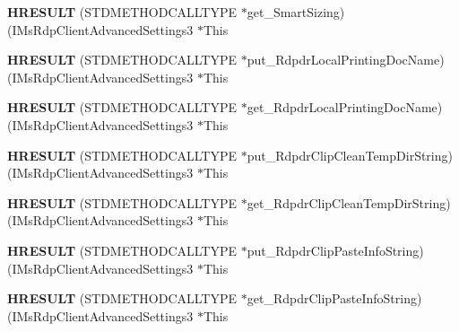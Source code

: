 \begin{DoxyCompactItemize}
{\bfseries H\+R\+E\+S\+U\+LT} (S\+T\+D\+M\+E\+T\+H\+O\+D\+C\+A\+L\+L\+T\+Y\+PE $\ast$get\+\_\+\+Smart\+Sizing)(I\+Ms\+Rdp\+Client\+Advanced\+Settings3 $\ast$This
\item 
\mbox{\label{struct_i_ms_rdp_client_advanced_settings3_vtbl_adcd0b79fb1172077b8ad6058b22fc055}} 
{\bfseries H\+R\+E\+S\+U\+LT} (S\+T\+D\+M\+E\+T\+H\+O\+D\+C\+A\+L\+L\+T\+Y\+PE $\ast$put\+\_\+\+Rdpdr\+Local\+Printing\+Doc\+Name)(I\+Ms\+Rdp\+Client\+Advanced\+Settings3 $\ast$This
\item 
\mbox{\label{struct_i_ms_rdp_client_advanced_settings3_vtbl_aac73475a8a1fa0673e26d1a905d6709d}} 
{\bfseries H\+R\+E\+S\+U\+LT} (S\+T\+D\+M\+E\+T\+H\+O\+D\+C\+A\+L\+L\+T\+Y\+PE $\ast$get\+\_\+\+Rdpdr\+Local\+Printing\+Doc\+Name)(I\+Ms\+Rdp\+Client\+Advanced\+Settings3 $\ast$This
\item 
\mbox{\label{struct_i_ms_rdp_client_advanced_settings3_vtbl_a78dc74500c7bf6c09ff104ae7d6afdba}} 
{\bfseries H\+R\+E\+S\+U\+LT} (S\+T\+D\+M\+E\+T\+H\+O\+D\+C\+A\+L\+L\+T\+Y\+PE $\ast$put\+\_\+\+Rdpdr\+Clip\+Clean\+Temp\+Dir\+String)(I\+Ms\+Rdp\+Client\+Advanced\+Settings3 $\ast$This
\item 
\mbox{\label{struct_i_ms_rdp_client_advanced_settings3_vtbl_aeba9fe4e2ccd168fdc17e0daea43d958}} 
{\bfseries H\+R\+E\+S\+U\+LT} (S\+T\+D\+M\+E\+T\+H\+O\+D\+C\+A\+L\+L\+T\+Y\+PE $\ast$get\+\_\+\+Rdpdr\+Clip\+Clean\+Temp\+Dir\+String)(I\+Ms\+Rdp\+Client\+Advanced\+Settings3 $\ast$This
\item 
\mbox{\label{struct_i_ms_rdp_client_advanced_settings3_vtbl_ad34468f026774061aa4d5d0e3fe79418}} 
{\bfseries H\+R\+E\+S\+U\+LT} (S\+T\+D\+M\+E\+T\+H\+O\+D\+C\+A\+L\+L\+T\+Y\+PE $\ast$put\+\_\+\+Rdpdr\+Clip\+Paste\+Info\+String)(I\+Ms\+Rdp\+Client\+Advanced\+Settings3 $\ast$This
\item 
\mbox{\label{struct_i_ms_rdp_client_advanced_settings3_vtbl_a463588a407e528ad15a0a40f7805551f}} 
{\bfseries H\+R\+E\+S\+U\+LT} (S\+T\+D\+M\+E\+T\+H\+O\+D\+C\+A\+L\+L\+T\+Y\+PE $\ast$get\+\_\+\+Rdpdr\+Clip\+Paste\+Info\+String)(I\+Ms\+Rdp\+Client\+Advanced\+Settings3 $\ast$This

\end{DoxyCompactItemize}
